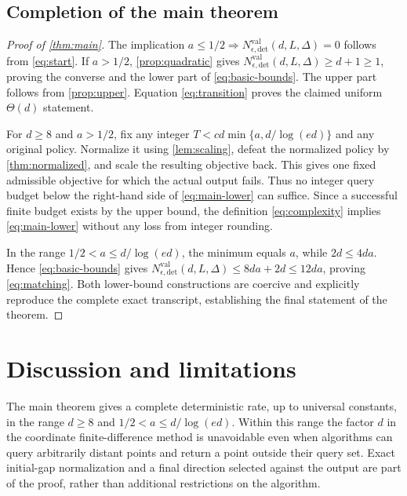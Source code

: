 \documentclass[11pt]{article}
\numberwithin{equation}{section}
\theoremstyle{definition}
\theoremstyle{remark}
\newcommand{\Nval}{N_{\epsilon,\mathrm{det}}^{\mathrm{val}}}
\begin{document}
\subsection{Completion of the main theorem}
\label{sec:main-proof}

\begin{proof}[Proof of \cref{thm:main}]
The implication $a\leq1/2\Rightarrow\Nval(d,L,\Delta)=0$ follows
from \eqref{eq:start}. If $a>1/2$, \cref{prop:quadratic} gives
$\Nval(d,L,\Delta)\geq d+1\geq1$, proving the converse and the lower part
of \eqref{eq:basic-bounds}. The upper part follows from
\cref{prop:upper}. Equation \eqref{eq:transition} proves the claimed
uniform $\Theta(d)$ statement.

For $d\geq8$ and $a>1/2$, fix any integer
$T<cd\min\{a,d/\log(ed)\}$ and any original policy.
Normalize it using \cref{lem:scaling}, defeat the normalized policy by
\cref{thm:normalized}, and scale the resulting objective back.
This gives one fixed admissible objective for which the actual output
fails. Thus no integer query budget below the right-hand side of
\eqref{eq:main-lower} can suffice. Since a successful finite budget exists
by the upper bound, the definition \eqref{eq:complexity} implies
\eqref{eq:main-lower} without any loss from integer rounding.

In the range $1/2<a\leq d/\log(ed)$, the minimum equals $a$, while
$2d\leq4da$. Hence \eqref{eq:basic-bounds} gives
$\Nval(d,L,\Delta)\leq8da+2d\leq12da$, proving \eqref{eq:matching}.
Both lower-bound constructions are coercive and explicitly reproduce the
complete exact transcript, establishing the final statement of the theorem.
\end{proof}


\section{Discussion and limitations}
\label{sec:scope}

The main theorem gives a complete deterministic rate, up to universal
constants, in the range $d\geq8$ and $1/2<a\leq d/\log(ed)$.
Within this range the factor $d$ in the coordinate finite-difference
method is unavoidable even when algorithms can query arbitrarily distant
points and return a point outside their query set. Exact initial-gap
normalization and a final direction selected against the output are part
of the proof, rather than additional restrictions on the algorithm.
\end{document}
